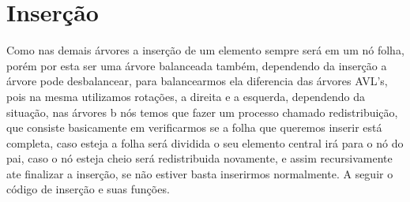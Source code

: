 \documentclass[report]{uftex}
\begin{document}
\section{Inserção}
\label{sec:insercao}
    
    \noindent Como nas demais árvores a inserção de um elemento sempre será em um nó folha, porém por esta ser uma árvore balanceada também, dependendo da inserção a árvore pode desbalancear, para balancearmos ela diferencia das árvores AVL's, pois na mesma utilizamos rotações, a direita e a esquerda, dependendo da situação, nas árvores b nós temos que fazer um processo chamado redistribuição, que consiste basicamente em verificarmos se a folha que queremos inserir está completa, caso esteja a folha será dividida o seu elemento central irá para o nó do pai, caso o nó esteja cheio será redistribuida novamente, e assim recursivamente ate finalizar a inserção, se não estiver basta inserirmos normalmente. A seguir o código de inserção e suas funções.
\end{document}
